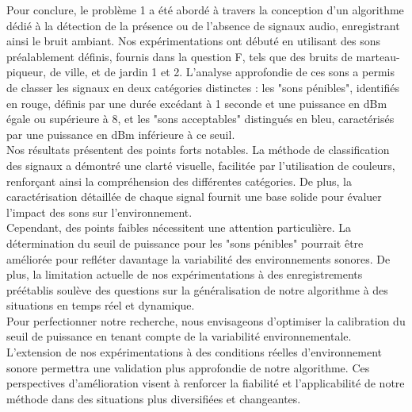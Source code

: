 Pour conclure, le problème 1 a été abordé à travers la conception d’un algorithme dédié à la détection de la présence ou de l’absence de signaux audio, enregistrant ainsi le bruit ambiant. Nos expérimentations ont débuté en utilisant des sons préalablement définis, fournis dans la question F, tels que des bruits de marteau-piqueur, de ville, et de jardin 1 et 2. L’analyse approfondie de ces sons a permis de classer les signaux en deux catégories distinctes : les "sons pénibles", identifiés en rouge, définis par une durée excédant à 1 seconde et une puissance en dBm égale ou supérieure à 8, et les "sons acceptables" distingués en bleu, caractérisés par une puissance en dBm inférieure à ce seuil. 
\\

Nos résultats présentent des points forts notables. La méthode de classification des signaux a démontré une clarté visuelle, facilitée par l'utilisation de couleurs, renforçant ainsi la compréhension des différentes catégories. De plus, la caractérisation détaillée de chaque signal fournit une base solide pour évaluer l'impact des sons sur l'environnement.
\\

Cependant, des points faibles nécessitent une attention particulière. La détermination du seuil de puissance pour les "sons pénibles" pourrait être améliorée pour refléter davantage la variabilité des environnements sonores. De plus, la limitation actuelle de nos expérimentations à des enregistrements préétablis soulève des questions sur la généralisation de notre algorithme à des situations en temps réel et dynamique.
\\

Pour perfectionner notre recherche, nous envisageons d'optimiser la calibration du seuil de puissance en tenant compte de la variabilité environnementale. L'extension de nos expérimentations à des conditions réelles d'environnement sonore permettra une validation plus approfondie de notre algorithme. Ces perspectives d'amélioration visent à renforcer la fiabilité et l'applicabilité de notre méthode dans des situations plus diversifiées et changeantes.
